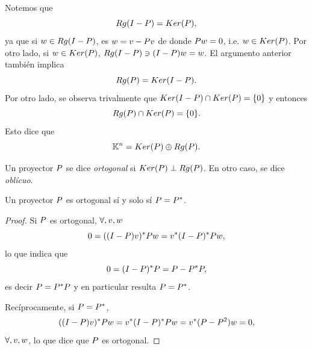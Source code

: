 Notemos que
$$Rg(\Ib-\Pb)=Ker(\Pb),$$
ya que si $\wb\in Rg(\Ib-\Pb)$, es $\wb=\vb-\Pb\vb$ de donde $\Pb\wb=\cero$, i.e. $\wb\in Ker(\Pb)$. Por otro lado, si $\wb\in Ker(\Pb)$,
$Rg(\Ib-\Pb)\ni (\Ib-\Pb)\wb=\wb$. El argumento anterior también implica
$$Rg(\Pb)=Ker(\Ib-\Pb).$$
Por otro lado, se observa trivalmente que  $Ker(\Ib-\Pb)\cap Ker(\Pb)=\{\cero\}$ y entonces
$$Rg(\Pb)\cap Ker(\Pb)=\{\cero\}.$$
Esto dice que
$$
\Kn=Ker(\Pb)\oplus Rg(\Pb).
$$
\tccdefi
\begin{definicion}
 Un proyector $\Pb$ se dice \emph{ortogonal} si $Ker(\Pb)\perp Rg(\Pb)$. En otro caso, se dice \emph{oblícuo}.
\end{definicion}
\etcc
\tcc
\begin{proposicion}
\label{prop:ortssiautoadjunto}
Un proyector $\Pb$ es ortogonal sí y solo sí $\Pb=\Pb^*$.
\end{proposicion}
\etcc
\begin{proof}
 Si $\Pb$ es ortogonal, $\forall, \vb,\wb$
 $$
 0=((\Ib-\Pb)\vb)^*\Pb\wb=\vb^*(\Ib-\Pb)^*\Pb\wb,
 $$
 lo que indica que
 $$
 \cero=(\Ib-\Pb)^*\Pb=\Pb-\Pb^*\Pb,
 $$
 es decir $\Pb=\Pb^*\Pb$ y en particular resulta $\Pb=\Pb^*$.

 Recíprocamente, si $\Pb=\Pb^*$,
 $$
 ((\Ib-\Pb)\vb)^*\Pb\wb=\vb^*(\Ib-\Pb)^*\Pb\wb=\vb^*(\Pb-\Pb^2)\wb=0,
 $$
 $\forall, \vb,\wb$, lo que dice que $\Pb$ es ortogonal.
\end{proof}

